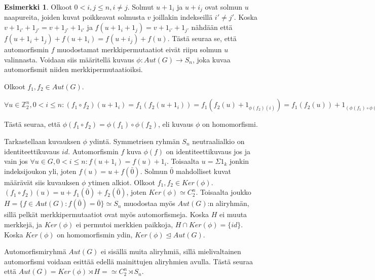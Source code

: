 \documentclass[a4paper, 12pt]{article}
\theoremstyle{definition}
\newtheorem{example}[mydef]{Esimerkki}
\theoremstyle{plain}
\begin{document}
\begin{example}
Olkoot $0 < i, j \leq n, i \neq j$. Solmut $u + 1_i$ ja $u+ i_j$ ovat solmun $u$ naapureita, joiden kuvat poikkeavat solmusta $v$ joillakin indekseillä $i' \neq j'$. Koska $v + 1_{i'} + 1_{j'} = v + 1_{j'} + 1_{i'}$ ja $f(u + 1_i + 1_j) = v + 1_{i'} + 1_{j'}$ nähdään että $f(u + 1_i + 1_j) + f(u + 1_i) = f(u + i_j) + f(u)$. Tästä seuraa se, että automorfismin $f$ muodostamat merkkipermutaatiot eivät riipu solmun $u$ valinnasta. Voidaan siis määritellä kuvaus ${\phi: Aut(G) \rightarrow S_n}$, joka kuvaa automorfismit niiden merkkipermutaatioiksi. 

Olkoot $f_1, f_2 \in Aut(G)$. 
\begin{center}
\begin{math}
\forall u \in \mathbb{Z}_2^n, 0 < i \leq n: (f_1 \circ f_2)(u + 1_i) = f_1(f_2(u + 1_i))
= f_1(f_2(u) + 1_{\phi(f_2)(i)}) = f_1(f_2(u)) + 1_{(\phi(f_1) \circ \phi(f_2))(i)}
\end{math}
\end{center}
Tästä seuraa, että $\phi(f_1 \circ f_2) = \phi(f_1) \circ \phi(f_2)$, eli kuvaus $\phi$ on homomorfismi.

Tarkastellaan kuvauksen $\phi$ ydintä. Symmetrisen ryhmän $S_n$ neutraalialkio on identiteettikuvaus $id$. Automorfismin $f$ kuva $\phi(f)$ on identiteettikuvaus jos ja vain jos $ \forall u \in G, 0 < i \leq n: f(u + 1_i) = f(u) + 1_i$. Toisaalta $u = \Sigma 1_k$ jonkin indeksijoukon yli, joten $f(u) = u + f(\bar{0})$. Solmun $\bar{0}$ mahdolliset kuvat määrävät siis kuvauksen $\phi$ ytimen alkiot. Olkoot $f_1, f_2 \in Ker(\phi)$. $(f_1 \circ f_2)(u) = u + f_1(\bar{0}) + f_2(\bar{0})$, joten $Ker(\phi) \simeq C_2^n$. Toisaalta joukko $H = \{f \in Aut(G) : f(\bar{0}) = \bar{0}\} \simeq S_n$ muodostaa myös $Aut(G)$:n aliryhmän, sillä pelkät merkkipermutaatiot ovat myös automorfismeja. Koska $H$ ei muuta merkkejä, ja $Ker(\phi)$ ei permutoi merkkien paikkoja, $H \cap Ker(\phi) = \{ id \}$. Koska $Ker(\phi)$ on homomorfismin ydin, $Ker(\phi) \trianglelefteq Aut(G)$.

Automorfismiryhmä $Aut(G)$ ei sisällä muita aliryhmiä, sillä mielivaltainen automorfismi voidaan esittää edellä mainittujen aliryhmien avulla. Tästä seuraa että $Aut(G) = Ker(\phi) \rtimes H = \simeq C_2^n \rtimes S_n$.
\end{example}
\end{document}

